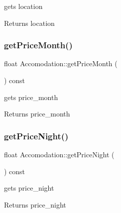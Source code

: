gets location 

\begin{DoxyReturn}{Returns}
location 
\end{DoxyReturn}
\hypertarget{class_accomodation_a3e58fd8b7a752fb7c8709fcb979cfbb5}{}\label{class_accomodation_a3e58fd8b7a752fb7c8709fcb979cfbb5} 
\subsubsection{\texorpdfstring{get\+Price\+Month()}{getPriceMonth()}}
{\footnotesize\ttfamily float Accomodation\+::get\+Price\+Month (\begin{DoxyParamCaption}{ }\end{DoxyParamCaption}) const\hspace{0.3cm}{\ttfamily [inline]}}



gets price\+\_\+month 

\begin{DoxyReturn}{Returns}
price\+\_\+month 
\end{DoxyReturn}
\hypertarget{class_accomodation_a9061a7cadf76377cbab25043e53ef5ef}{}\label{class_accomodation_a9061a7cadf76377cbab25043e53ef5ef} 
\subsubsection{\texorpdfstring{get\+Price\+Night()}{getPriceNight()}}
{\footnotesize\ttfamily float Accomodation\+::get\+Price\+Night (\begin{DoxyParamCaption}{ }\end{DoxyParamCaption}) const\hspace{0.3cm}{\ttfamily [inline]}}



gets price\+\_\+night 

\begin{DoxyReturn}{Returns}
price\+\_\+night 
\end{DoxyReturn}
\hypertarget{class_accomodation_ab466bd7dc51b8f48ac4e9152c96c95f7}{}\label{class_accomodation_ab466bd7dc51b8f48ac4e9152c96c95f7} 
